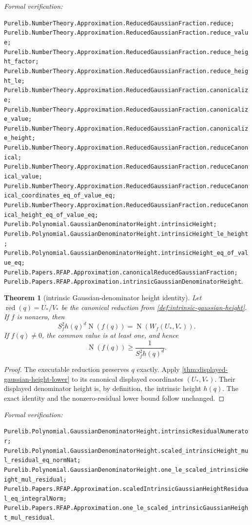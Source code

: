 \documentclass[11pt]{article}
\newtheorem{theorem}{Theorem}[section]
\newcommand{\Norm}[1]{\operatorname{N}\!\left(#1\right)}
\newcommand{\leanref}[1]{\par\smallskip\noindent
  \emph{Formal verification:}\par\nobreak
  {\raggedright\nolinkurl{#1}.\par}}
\begin{document}
\leanref{Purelib.NumberTheory.Approximation.ReducedGaussianFraction.reduce;
Purelib.NumberTheory.Approximation.ReducedGaussianFraction.reduce_value;
Purelib.NumberTheory.Approximation.ReducedGaussianFraction.reduce_height_factor;
Purelib.NumberTheory.Approximation.ReducedGaussianFraction.reduce_height_le;
Purelib.NumberTheory.Approximation.ReducedGaussianFraction.canonicalize;
Purelib.NumberTheory.Approximation.ReducedGaussianFraction.canonicalize_value;
Purelib.NumberTheory.Approximation.ReducedGaussianFraction.canonicalize_height;
Purelib.NumberTheory.Approximation.ReducedGaussianFraction.reduceCanonical;
Purelib.NumberTheory.Approximation.ReducedGaussianFraction.reduceCanonical_value;
Purelib.NumberTheory.Approximation.ReducedGaussianFraction.reduceCanonical_coordinates_eq_of_value_eq;
Purelib.NumberTheory.Approximation.ReducedGaussianFraction.reduceCanonical_height_eq_of_value_eq;
Purelib.Polynomial.GaussianDenominatorHeight.intrinsicHeight;
Purelib.Polynomial.GaussianDenominatorHeight.intrinsicHeight_le_height;
Purelib.Polynomial.GaussianDenominatorHeight.intrinsicHeight_eq_of_value_eq;
Purelib.Papers.RFAP.Approximation.canonicalReducedGaussianFraction;
Purelib.Papers.RFAP.Approximation.intrinsicGaussianDenominatorHeight}

\begin{theorem}[intrinsic Gaussian-denominator height identity]
\label{thm:gaussian-height-lower}
Let $\operatorname{red}(q)=U_*/V_*$ be the canonical reduction from
\cref{def:intrinsic-gaussian-height}.  If $f$ is nonzero, then
\begin{equation}
\label{eq:gaussian-height-identity}
 S_f^2h(q)^d\Norm{f(q)}=\Norm{W_f(U_*,V_*)}.
\end{equation}
If $f(q)\ne0$, the common value is at least one, and hence
\begin{equation}
\label{eq:gaussian-height-lower}
                         \Norm{f(q)}\ge
                         \frac1{S_f^2h(q)^d}.
\end{equation}
\end{theorem}

\begin{proof}
The executable reduction preserves $q$ exactly.  Apply
\cref{thm:displayed-gaussian-height-lower} to its canonical displayed
coordinates $(U_*,V_*)$.  Their displayed denominator height is, by
definition, the intrinsic height $h(q)$.  The exact identity and the
nonzero-residual lower bound follow unchanged.
\end{proof}

\leanref{Purelib.Polynomial.GaussianDenominatorHeight.intrinsicResidualNumerator;
Purelib.Polynomial.GaussianDenominatorHeight.scaled_intrinsicHeight_mul_residual_eq_normNat;
Purelib.Polynomial.GaussianDenominatorHeight.one_le_scaled_intrinsicHeight_mul_residual;
Purelib.Papers.RFAP.Approximation.scaledIntrinsicGaussianHeightResidual_eq_integralNorm;
Purelib.Papers.RFAP.Approximation.one_le_scaled_intrinsicGaussianHeight_mul_residual}
\end{document}
